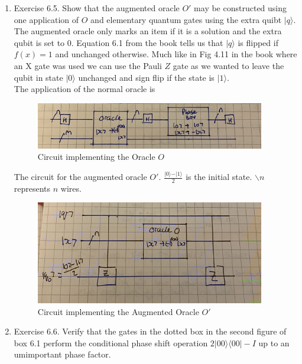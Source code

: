 \documentclass[12pt]{article}
\newcommand{\ket}[1]{\vert{#1}\rangle}
\newcommand{\bra}[1]{\langle{#1}\vert}
\begin{document}
\begin{enumerate}
    \item Exercise 6.5. Show that the augmented oracle $O'$ may be constructed using one application of $O$ and elementary quantum gates using the extra quibt $\ket{q}$. The augmented oracle only marks an item if it is a solution and the extra qubit is set to 0. Equation 6.1 from the book tells us that $\ket{q}$ is flipped if $f(x) =1$ and unchanged otherwise. Much like in Fig 4.11 in the book where an X gate was used we can use the Pauli $Z$ gate as we wanted to leave the qubit in state $\ket{0}$ unchanged and sign flip if the state is $\ket{1}$. 
    \\
    The application of the normal oracle is 

    \begin{figure}[h]
        
        \includegraphics[width=10cm]{Oracle.jpg}
        \centering
        \caption{Circuit implementing the Oracle $O$}
    \end{figure}
    The circuit for the augmented oracle $O'$. $\frac{\ket{0} - \ket{1}}{2}$ is the initial state. $\backslash n$ represents $n$ wires. 
    \begin{figure}[h]
        
        \includegraphics[width=10cm]{Augmented Oracle.jpg}
        \centering
        \caption{Circuit implementing the Augmented Oracle $O'$}
    \end{figure}

    \item Exercise 6.6. Verify that the gates in the dotted box in the second figure of box 6.1 perform the conditional phase shift operation $2 \ket{00} \bra{00} - I$ up to an umimportant phase factor. 
    \\
    \begin{figure}[h]
        

\end{figure}
\end{enumerate}
\end{document}
